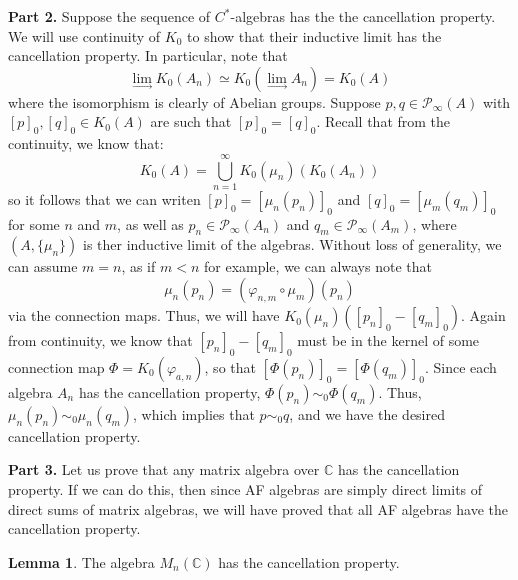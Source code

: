 \documentclass[aps,pra,showpacs,notitlepage,onecolumn,superscriptaddress,nofootinbib]{revtex4-1}
\theoremstyle{definition}
\newtheorem{lemma}{Lemma}[section]
\begin{document}
\noindent \textbf{Part 2.} Suppose the sequence of $C^{*}$-algebras has the the cancellation property. We will use continuity of $K_0$ to show that their inductive limit has the cancellation property.
In particular, note that
\begin{equation}
  \lim_{\longrightarrow} K_0(A_n) \simeq K_0(\lim_{\longrightarrow} A_n) = K_0(A)
\end{equation}
where the isomorphism is clearly of Abelian groups. Suppose $p, q \in \mathcal{P}_{\infty}(A)$ with $[p]_0, [q]_0 \in K_0(A)$ are such that $[p]_0 = [q]_0$.
Recall that from the continuity, we know that:
\begin{equation}
  K_0(A) = \displaystyle\bigcup_{n = 1}^{\infty} K_0(\mu_n)(K_0(A_n))
\end{equation}
so it follows that we can writen $[p]_0 = [\mu_n(p_n)]_0$ and $[q]_0 = [\mu_m(q_m)]_0$ for some $n$ and $m$, as well as $p_n \in \mathcal{P}_{\infty}(A_n)$ and $q_m \in \mathcal{P}_{\infty}(A_m)$,
where $(A, \{\mu_n\})$ is ther inductive limit of the algebras. Without loss of generality, we can assume $m = n$, as if $m < n$ for example, we can always note that
\begin{equation}
  \mu_n(p_n) = (\varphi_{n, m} \circ \mu_m)(p_n)
\end{equation}
via the connection maps. Thus, we will have $K_0(\mu_n)([p_n]_0 - [q_m]_0)$. Again from continuity, we know that $[p_n]_0 - [q_m]_0$ must be in the kernel of some connection map $\Phi = K_0(\varphi_{a, n})$,
so that $[\Phi(p_n)]_0 = [\Phi(q_m)]_0$. Since each algebra $A_n$ has the cancellation property, $\Phi(p_n) \sim_0 \Phi(q_m)$. Thus, $\mu_n(p_n) \sim_0 \mu_n(q_m)$, which implies that $p \sim_0 q$, and we have the
desired cancellation property.
\newline

\noindent \textbf{Part 3.} Let us prove that any matrix algebra over $\mathbb{C}$ has the cancellation property. If we can do this, then
since AF algebras are simply direct limits of direct sums of matrix algebras, we will have proved that all AF algebras have the cancellation property.
\newline

\begin{lemma}
  The algebra $M_n(\mathbb{C})$ has the cancellation property.
\end{lemma}
\end{document}
